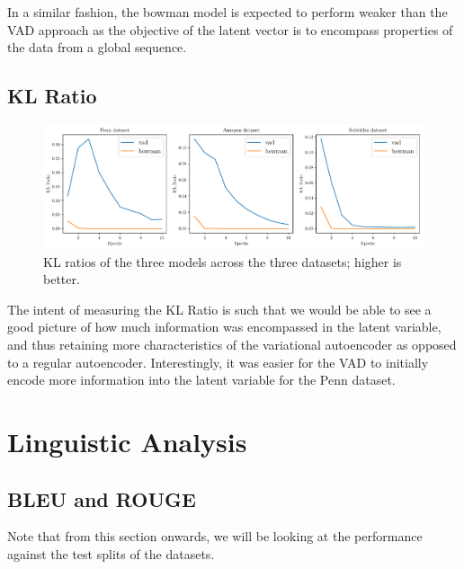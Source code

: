 \documentclass[12pt,twoside]{report}
\begin{document}
In a similar fashion, the bowman model is expected to perform weaker than the VAD approach as the objective of the latent vector is to encompass properties of the data from a global sequence. 

\subsection{KL Ratio}

\begin{figure}[!ht]
	\centering
	\includegraphics[width=150mm]{results/kl_ratio.pdf}
	\caption{KL ratios of the three models across the three datasets; higher is better.\label{r:kl_ratio}}
  \end{figure}

The intent of measuring the KL Ratio is such that we would be able to see a good picture of how much information was encompassed in the latent variable, and thus retaining more characteristics of the variational autoencoder as opposed to a regular autoencoder. Interestingly, it was easier for the VAD to initially encode more information into the latent variable for the Penn dataset.


\section{Linguistic Analysis}
\subsection{BLEU and ROUGE}

Note that from this section onwards, we will be looking at the performance against the test splits of the datasets. 
\end{document}
